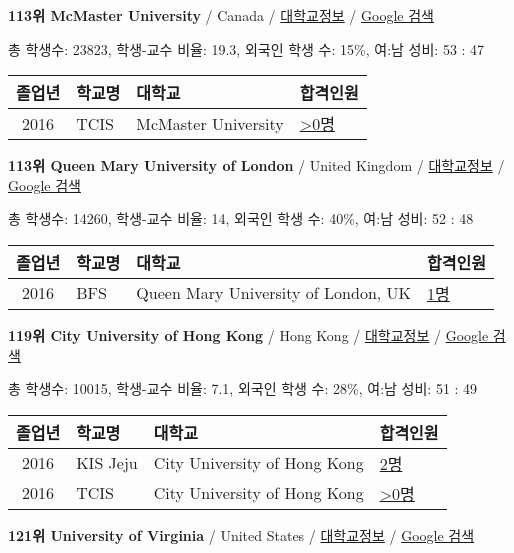 \documentclass[13pt,]{article}
\begin{document}
\textbf{113위 McMaster University} / Canada /
\href{https://www.timeshighereducation.com/world-university-rankings/mcmaster-university?ranking-dataset=589595}{대학교정보}
/ \href{http://www.google.com/search?q=McMaster+University}{Google 검색}

총 학생수: 23823, 학생-교수 비율: 19.3, 외국인 학생 수: 15\%, 여:남
성비: 53 : 47

\begin{longtable}[]{@{}clll@{}}
\toprule
졸업년 & 학교명 & 대학교 & 합격인원\tabularnewline
\midrule
\endhead
2016 & TCIS & McMaster University &
\href{http://cafe.naver.com/assarabia/11598}{\textgreater{}0명}\tabularnewline
\bottomrule
\end{longtable}

\textbf{113위 Queen Mary University of London} / United Kingdom /
\href{https://www.timeshighereducation.com/world-university-rankings/queen-mary-university-of-london?ranking-dataset=589595}{대학교정보}
/
\href{http://www.google.com/search?q=Queen+Mary+University+of+London}{Google
검색}

총 학생수: 14260, 학생-교수 비율: 14, 외국인 학생 수: 40\%, 여:남 성비:
52 : 48

\begin{longtable}[]{@{}clll@{}}
\toprule
졸업년 & 학교명 & 대학교 & 합격인원\tabularnewline
\midrule
\endhead
2016 & BFS & Queen Mary University of London, UK &
\href{http://cafe.naver.com/assarabia/11597}{1명}\tabularnewline
\bottomrule
\end{longtable}

\textbf{119위 City University of Hong Kong} / Hong Kong /
\href{https://www.timeshighereducation.com/world-university-rankings/city-university-of-hong-kong?ranking-dataset=589595}{대학교정보}
/
\href{http://www.google.com/search?q=City+University+of+Hong+Kong}{Google
검색}

총 학생수: 10015, 학생-교수 비율: 7.1, 외국인 학생 수: 28\%, 여:남 성비:
51 : 49

\begin{longtable}[]{@{}clll@{}}
\toprule
졸업년 & 학교명 & 대학교 & 합격인원\tabularnewline
\midrule
\endhead
2016 & KIS Jeju & City University of Hong Kong &
\href{http://cafe.naver.com/assarabia/11596}{2명}\tabularnewline
2016 & TCIS & City University of Hong Kong &
\href{http://cafe.naver.com/assarabia/11598}{\textgreater{}0명}\tabularnewline
\bottomrule
\end{longtable}

\textbf{121위 University of Virginia} / United States /
\href{https://www.timeshighereducation.com/world-university-rankings/university-of-virginia?ranking-dataset=589595}{대학교정보}
/ \href{http://www.google.com/search?q=University+of+Virginia}{Google
검색}
\end{document}
